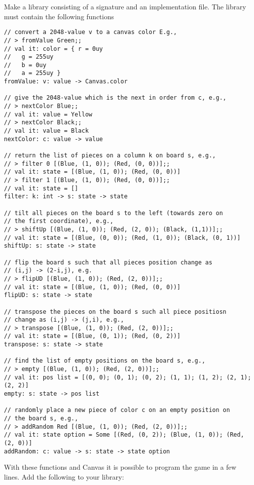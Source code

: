 Make a library consisting of a signature and an implementation file. The library must contain the following functions
\begin{lstlisting}
// convert a 2048-value v to a canvas color E.g., 
// > fromValue Green;;
// val it: color = { r = 0uy
//   g = 255uy
//   b = 0uy
//   a = 255uy }
fromValue: v: value -> Canvas.color

// give the 2048-value which is the next in order from c, e.g.,
// > nextColor Blue;;
// val it: value = Yellow
// > nextColor Black;;
// val it: value = Black
nextColor: c: value -> value

// return the list of pieces on a column k on board s, e.g.,
// > filter 0 [(Blue, (1, 0)); (Red, (0, 0))];;
// val it: state = [(Blue, (1, 0)); (Red, (0, 0))]
// > filter 1 [(Blue, (1, 0)); (Red, (0, 0))];;
// val it: state = []
filter: k: int -> s: state -> state

// tilt all pieces on the board s to the left (towards zero on
// the first coordinate), e.g.,
// > shiftUp [(Blue, (1, 0)); (Red, (2, 0)); (Black, (1,1))];;
// val it: state = [(Blue, (0, 0)); (Red, (1, 0)); (Black, (0, 1))]
shiftUp: s: state -> state

// flip the board s such that all pieces position change as
// (i,j) -> (2-i,j), e.g.
// > flipUD [(Blue, (1, 0)); (Red, (2, 0))];;                 
// val it: state = [(Blue, (1, 0)); (Red, (0, 0))]
flipUD: s: state -> state

// transpose the pieces on the board s such all piece positiosn
// change as (i,j) -> (j,i), e.g.,
// > transpose [(Blue, (1, 0)); (Red, (2, 0))];;
// val it: state = [(Blue, (0, 1)); (Red, (0, 2))]
transpose: s: state -> state

// find the list of empty positions on the board s, e.g., 
// > empty [(Blue, (1, 0)); (Red, (2, 0))];;    
// val it: pos list = [(0, 0); (0, 1); (0, 2); (1, 1); (1, 2); (2, 1); (2, 2)]
empty: s: state -> pos list

// randomly place a new piece of color c on an empty position on
// the board s, e.g.,
// > addRandom Red [(Blue, (1, 0)); (Red, (2, 0))];;
// val it: state option = Some [(Red, (0, 2)); (Blue, (1, 0)); (Red, (2, 0))]
addRandom: c: value -> s: state -> state option
\end{lstlisting}
With these functions and Canvas it is possible to program the game in a few lines. Add the following to your library:
